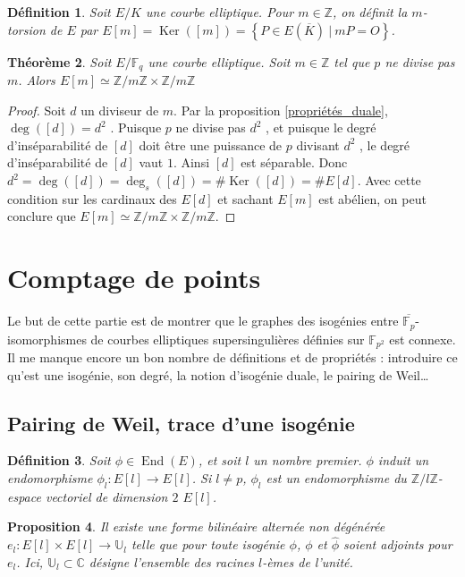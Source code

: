 \documentclass{article}
\theoremstyle{plain}%
\newtheorem{thm}{Théorème}[section]
\newtheorem{prop}[thm]{Proposition}
\newtheorem{deff}[thm]{Définition}
\theoremstyle{definition}%
\newcommand{\F}{\mathbb{F}}
\newcommand{\Z}{\mathbb{Z}}
\newcommand{\h}{\widehat}
\DeclareMathOperator{\End}{End}
\DeclareMathOperator{\Ker}{Ker}
\begin{document}
\begin{deff}
  Soit $E/K$ une courbe elliptique. Pour $m\in\Z$, on définit la $m$-torsion de $E$ par $ E[m] = \Ker([m])= \left\{ P\in E(\overline{K}) \ \vert\  mP = O \right\}$.
\end{deff}

\begin{thm}
  \label{structure_torsion}
  Soit $E/\F_q$ une courbe elliptique. Soit $m\in \Z$ tel que $p$ ne divise pas $m$. Alors $E[m] \simeq {\Z}/{m\Z} \times  {\Z}/{m\Z}$
\end{thm}

\begin{proof}
Soit $d$ un diviseur de $m$. 
Par la proposition \ref{propriétés_duale}, $\deg([d]) = d^2$ . Puisque $p$ ne divise pas $d^2$ , et puisque le degré d'inséparabilité de $[d]$ doit être une puissance de $p$ divisant $d^2$ , le degré d'inséparabilité de $[d]$ vaut $1$. Ainsi $[d]$ est séparable. Donc $d^2 = \deg([d]) = \deg_s([d]) = \#\Ker([d]) = \#E[d]$. 
Avec cette condition sur les cardinaux des $E[d]$ et sachant $E[m]$ est abélien, on peut conclure que $E[m] \simeq {\Z}/{m\Z} \times  {\Z}/{m\Z}$.
\end{proof}



\section{Comptage de points}
Le but de cette partie est de montrer que le graphes des isogénies entre $\overline{\F_p}$-isomorphismes de courbes elliptiques supersingulières définies sur $\F_{p^2}$ est connexe. Il me manque encore un bon nombre de définitions et de propriétés : introduire ce qu'est une isogénie, son degré, la notion d'isogénie duale, le pairing de Weil\ldots

\subsection{Pairing de Weil, trace d'une isogénie}

\begin{deff}
  Soit $\phi\in \End(E)$, et soit $l$ un nombre premier. $\phi$ induit un endomorphisme $\phi_l : E[l] \to E[l]$. Si $l\neq p$, $\phi_l$ est un endomorphisme du $\Z/l\Z$-espace vectoriel de dimension $2$ $E[l]$. 
\end{deff}

\begin{prop}
  \label{pairing}
  Il existe une forme bilinéaire alternée non dégénérée 
  $e_l : E[l] \times E[l] \to \mathbb{U}_l$ telle que pour toute isogénie $\phi$, $\phi$ et $\h\phi$ soient adjoints pour $e_l$.
  Ici, $\mathbb{U}_l \subset \mathbb{C}$ 
  désigne l'ensemble des racines $l$-èmes de l'unité.
\end{prop}
\end{document}
